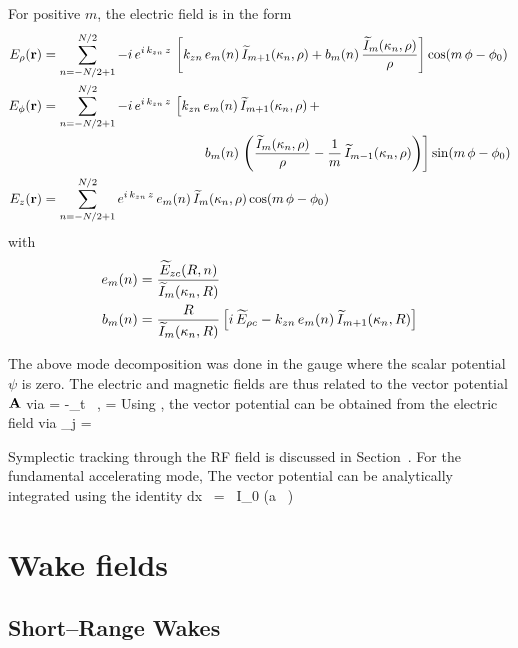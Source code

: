 For positive $m$, the electric field is in the form
\begin{align}
  E_\rho({\bf r}) &= \sum_{n=-N/2+1}^{N/2}
    -i \, e^{i \, k_{zn} \, z} \, 
    \left[ 
    k_{zn} \, e_m(n) \, \widetilde I_{m+1}(\kappa_n, \rho) +
    b_m(n) \, \frac{\widetilde I_m(\kappa_n, \rho)}{\rho}
    \right]
    \cos(m \, \phi - \phi_0) \nonumber \\
  E_\phi({\bf r}) &= \sum_{n=-N/2+1}^{N/2} 
    -i \, e^{i \, k_{zn} \, z} \, 
    \left[
    k_{zn} \, e_m(n) \, \widetilde I_{m+1}(\kappa_n, \rho) \, + \right. \\
  & \left. \qquad \qquad \qquad \qquad \qquad \qquad
    b_m(n) \, \left( \frac{\widetilde I_m(\kappa_n, \rho)}{\rho} - 
    \frac{1}{m} \, \widetilde I_{m-1}(\kappa_n, \rho) \right)
    \right] 
    \sin(m \, \phi - \phi_0) \nonumber \\
  E_z({\bf r}) &= \sum_{n=-N/2+1}^{N/2}e^{i \, k_{zn} \, z} \, 
    e_m(n) \, \widetilde I_m(\kappa_n, \rho) \cos(m \, \phi - \phi_0) \nonumber
\end{align}
with
\begin{align}
  e_m(n) &= \frac{\widetilde E_{zc}(R, n)}{\widetilde I_m(\kappa_n, R)} \nonumber \\
  b_m(n) &= \frac{R}{\widetilde I_m(\kappa_n, R)} \left[
    i \, \widetilde E_{\rho c} - k_{zn} \, e_m(n) \, \widetilde I_{m+1}(\kappa_n, R)
    \right]
\end{align}

The above mode decomposition was done in the gauge where the scalar
potential $\psi$ is zero. The electric and magnetic fields are thus
related to the vector potential ${\bf A}$ via
\Begineq
  \bfE = -\partial_t \, \bfA, \qquad \bfB = \nabla \times \bfA
\Endeq
Using , the vector potential can be obtained from the
electric field via
\Begineq
  \bfA_j = 
  \label{aiew}
\Endeq
 
Symplectic tracking through the RF field is discussed in
Section~.  For the fundamental accelerating mode,
The vector potential can be analytically integrated using the identity
\Begineq
  \int dx \,  = 
   \, I_0 (a \, )
\Endeq

\section{Wake fields}
\label{s:wake.fields}

\subsection{Short--Range Wakes}

